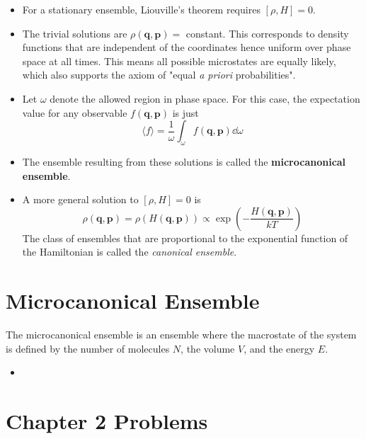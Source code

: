 \documentclass{article}
\newcommand{\ve}{\mathbf}
\begin{document}
\begin{itemize}
    \item For a stationary ensemble, Liouville's theorem requires $[\rho,H]=0$.
    \item The trivial solutions are $\rho(\ve q, \ve p)=$ constant. This corresponds to density functions that are independent of the coordinates hence uniform over phase space at all times. This means all possible microstates are equally likely, which also supports the axiom of "equal \textit{a priori} probabilities".
    \item Let $\omega$ denote the allowed region in phase space. For this case, the expectation value for any observable $f(\ve q,\ve p)$ is just
    \begin{equation}
        \langle f\rangle = \frac{1}{\omega}\int_{\omega}f(\ve q,\ve p)\dd\omega
    \end{equation}
    \item The ensemble resulting from these solutions is called the \textbf{microcanonical ensemble}.
    \item A more general solution to $[\rho,H]=0$ is 
    \begin{equation}
        \rho(\ve q, \ve p)=\rho(H(\ve q, \ve p))\propto\exp\left(-\frac{H(\ve q,\ve p)}{kT}\right)
    \end{equation}
    The class of ensembles that are proportional to the exponential function of the Hamiltonian is called the \textit{canonical ensemble}.
\end{itemize}
\section{Microcanonical Ensemble}
\begin{definition}
    The microcanonical ensemble is an ensemble where the macrostate of the system is defined by the number of molecules $N$, the volume $V$, and the energy $E$.
\end{definition}
\begin{itemize}
    \item 
\end{itemize}
\section{Chapter 2 Problems}
\end{document}

